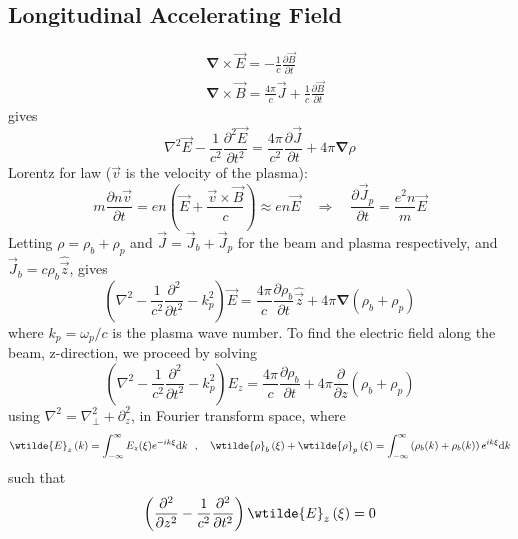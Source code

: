 \subsection{Longitudinal Accelerating Field} %
\begin{align}
&\boldsymbol{\nabla}\times \vec{E}=-\frac{1}{c}\frac{\partial \vec{B}}{\partial t} \\
&\boldsymbol{\nabla}\times \vec{B}=\frac{4\pi}{c}\vec{J}+\frac{1}{c}\frac{\partial \vec{B}}{\partial t}
\end{align}
gives
\begin{equation}
\nabla^2\vec{E}-\frac{1}{c^2}\frac{\partial^2 \vec{E}}{\partial t^2}=\frac{4\pi}{c^2}\frac{\partial \vec{J}}{\partial t}+4\pi\boldsymbol{\nabla}\rho
\end{equation}
Lorentz for law ($\vec{v}$ is the velocity of the plasma):
\begin{equation}
m\frac{\partial n\vec{v}}{\partial t}=en\left(\vec{E}+\frac{\vec{v}\times\vec{B}}{c} \right)\approx en\vec{E} \quad \Rightarrow \quad
\frac{\partial \vec{J}_p}{\partial t}=\frac{e^2 n}{m}\vec{E}
\end{equation}
Letting $\rho=\rho_b+\rho_p$ and $\vec{J}=\vec{J}_b+\vec{J}_p$ for the beam and plasma respectively, and $\vec{J}_b=c\rho_b\hat{\vec{z}}$, gives
\begin{equation}
\left(\nabla^2-\frac{1}{c^2}\frac{\partial^2}{\partial t^2}-k_p^2\right)\vec{E}=\frac{4\pi}{c}\frac{\partial \rho_b}{\partial t}\hat{\vec{z}}+4\pi\boldsymbol{\nabla}\left(\rho_b+\rho_p\right)
\end{equation}
where $k_p=\omega_p/c$ is the plasma wave number. To find the electric field along the beam, z-direction, we proceed by solving
\begin{equation}
\left(\nabla^2-\frac{1}{c^2}\frac{\partial^2}{\partial t^2}-k_p^2\right)E_z=\frac{4\pi}{c}\frac{\partial \rho_b}{\partial t}+4\pi\frac{\partial}{\partial z}\left(\rho_b+\rho_p\right)
\end{equation}
using $\nabla^2=\nabla^2_{\perp}+\partial^2_z$, in Fourier transform space, where
\begin{equation}
\wtilde{E}_z\left(k\right)=\int_ {-\infty}^{\infty}E_z(\xi)e^{-ik\xi}\mathrm{d}k~~,~~~\wtilde{\rho}_b\left(\xi\right)+\wtilde{\rho}_p\left(\xi\right)=\int_ {-\infty}^{\infty}\left(\rho_b(k)+\rho_b(k)\right)e^{ik\xi}\mathrm{d}k
\end{equation}
such that 
\begin{equation}
\left(\frac{\partial^2 }{\partial z^2}-\frac{1}{c^2}\frac{\partial^2 }{\partial t^2}\right)\wtilde{E}_z\left(\xi\right)=0
\end{equation}
